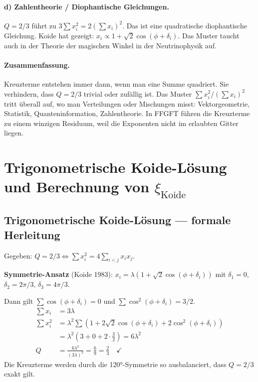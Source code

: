 \paragraph{d) Zahlentheorie / Diophantische Gleichungen.}
$Q=2/3$ führt zu $3\sum x_i^2=2(\sum x_i)^2$.
Das ist eine quadratische diophantische Gleichung.
Koide hat gezeigt: $x_i\propto1+\sqrt{2}\cos(\phi+\delta_i)$.
Das Muster taucht auch in der Theorie der magischen Winkel in der Neutrinophysik auf.

\paragraph{Zusammenfassung.}
Kreuzterme entstehen immer dann, wenn man eine Summe quadriert.
Sie verhindern, dass $Q=2/3$ trivial oder zufällig ist.
Das Muster $\sum x_i^2/(\sum x_i)^2$ tritt überall auf, wo man
Verteilungen oder Mischungen misst:
Vektorgeometrie, Statistik, Quanteninformation, Zahlentheorie.
In FFGFT führen die Kreuzterme zu einem winzigen Residuum,
weil die Exponenten nicht im erlaubten Gitter liegen.

\section{Trigonometrische Koide-Lösung und Berechnung von $\xi_{\text{Koide}}$}


\subsection{Trigonometrische Koide-Lösung — formale Herleitung}

Gegeben: $Q=2/3 \Leftrightarrow \sum x_i^2=4\sum_{i<j}x_ix_j$.

\textbf{Symmetrie-Ansatz} (Koide 1983):
$x_i=\lambda(1+\sqrt{2}\cos(\phi+\delta_i))$
mit $\delta_1=0$, $\delta_2=2\pi/3$, $\delta_3=4\pi/3$.

Dann gilt $\sum\cos(\phi+\delta_i)=0$ und $\sum\cos^2(\phi+\delta_i)=3/2$.
\begin{align*}
  \sum x_i &= 3\lambda \\
  \sum x_i^2 &= \lambda^2\sum(1+2\sqrt{2}\cos(\phi+\delta_i)+2\cos^2(\phi+\delta_i)) \\
              &= \lambda^2(3+0+2\cdot\tfrac{3}{2}) = 6\lambda^2 \\
  Q &= \frac{6\lambda^2}{(3\lambda)^2} = \frac{6}{9} = \frac{2}{3} \quad\checkmark
\end{align*}
Die Kreuzterme werden durch die 120°-Symmetrie so ausbalanciert,
dass $Q=2/3$ exakt gilt.


